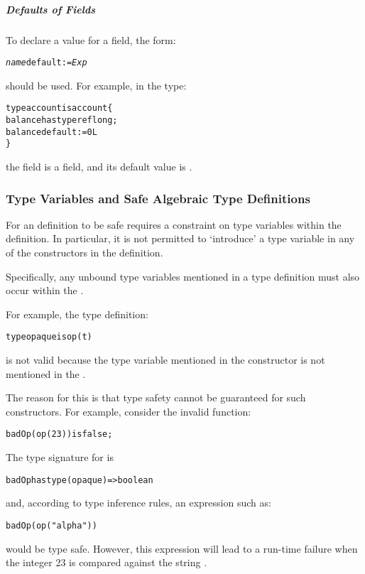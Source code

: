 \subparagraph{Defaults of  Fields}
To declare a  value for a  field, the form:
\begin{alltt}
\emph{name} default := \emph{Exp}
\end{alltt}
should be used. For example, in the type:
\begin{alltt}
type account is account\{
  balance has type ref long;
  balance default := 0L
\}
\end{alltt}
the  field is a  field, and its default value is .

\subsubsection{Type Variables and Safe Algebraic Type Definitions}
For an  definition to be safe requires a constraint on type variables within the definition. In particular, it is not permitted to `introduce' a type variable in any of the constructors in the definition. 

\begin{aside}
Specifically, any unbound type variables mentioned in a type definition must also occur within the .
\end{aside}

For example, the type definition:
\begin{alltt}
type opaque is op(\pcent{}t)
\end{alltt}
is not valid because the type variable  mentioned in the  constructor is not mentioned in the .

\begin{aside}
The reason for this is that type safety cannot be guaranteed for such constructors. For example, consider the invalid function:
\begin{alltt}
badOp(op(23)) is false;
\end{alltt}
The type signature for  is 
\begin{alltt}
badOp has type (opaque)=>boolean
\end{alltt}
and, according to type inference rules, an expression such as:
\begin{alltt}
badOp(op("alpha"))
\end{alltt}
would be type safe. However, this expression will lead to a run-time failure when the integer 23 is compared against the string .
\end{aside}

